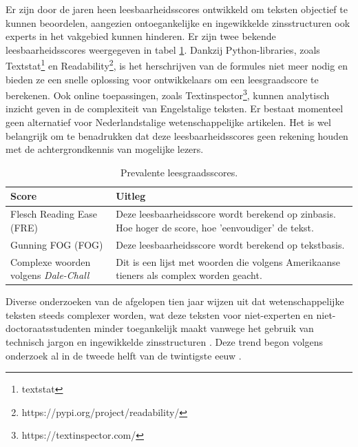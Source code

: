 \medspace


Er zijn door de jaren heen leesbaarheidsscores ontwikkeld om teksten objectief te kunnen beoordelen, aangezien ontoegankelijke en ingewikkelde zinsstructuren ook experts in het vakgebied kunnen hinderen. Er zijn twee bekende leesbaarheidsscores weergegeven in tabel \ref{table:readability-scores}. Dankzij Python-libraries, zoals Textstat\footnote{textstat} en Readability\footnote{https://pypi.org/project/readability/}, is het herschrijven van de formules niet meer nodig en bieden ze een snelle oplossing voor ontwikkelaars om een leesgraadscore te berekenen. Ook online toepassingen, zoals Textinspector\footnote{https://textinspector.com/}, kunnen analytisch inzicht geven in de complexiteit van Engelstalige teksten. Er bestaat momenteel geen alternatief voor Nederlandstalige wetenschappelijke artikelen. Het is wel belangrijk om te benadrukken dat deze leesbaarheidsscores geen rekening houden met de achtergrondkennis van mogelijke lezers.

\begin{center}
	\begin{table}[H]
	\begin{tabular}{ | m{5cm} | m{10cm} | } 
		\hline
		\textbf{Score} & \textbf{Uitleg} \\ 
		\hline
		Flesch Reading Ease (FRE) & Deze leesbaarheidsscore wordt berekend op zinbasis. Hoe hoger de score, hoe 'eenvoudiger' de tekst. \\
		\hline
		Gunning FOG (FOG) & Deze leesbaarheidsscore wordt berekend op tekstbasis. \\
		\hline
		Complexe woorden volgens \textit{Dale-Chall} & Dit is een lijst met woorden die volgens Amerikaanse tieners als complex worden geacht. \\
		\hline
	\end{tabular}
	\caption{Prevalente leesgraadsscores.}
	\label{table:readability-scores}
	\end{table}
\end{center}

Diverse onderzoeken van de afgelopen tien jaar wijzen uit dat wetenschappelijke teksten steeds complexer worden, wat deze teksten voor niet-experten en niet-doctoraatsstudenten minder toegankelijk maakt vanwege het gebruik van technisch jargon en ingewikkelde zinsstructuren \autocite{Ball2017, PlavenSigray2017, Jones2019}. Deze trend begon volgens onderzoek al in de tweede helft van de twintigste eeuw \autocite{Hayes1992}.

\medspace

